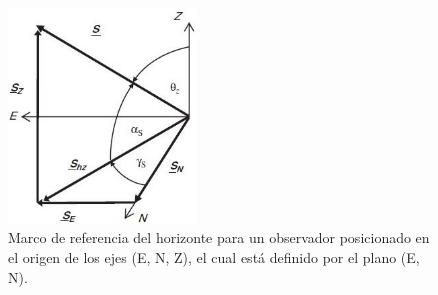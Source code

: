 \begin{figure}[H]
	\centering
	\includegraphics[width=5cm]{imagenes/marcolocal}
	\caption{Marco de referencia del horizonte para un observador posicionado en el origen de los ejes (E, N, Z), el cual está definido por el plano (E, N).}
	\label{fig:marcolocal}
\end{figure}

